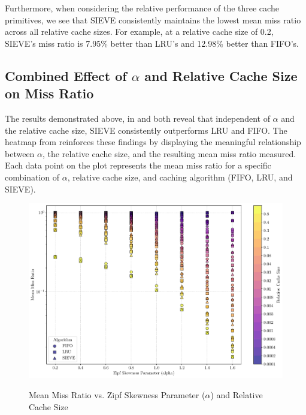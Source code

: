 Furthermore, when considering the relative performance of the three cache primitives, we see that SIEVE consistently maintains the lowest mean miss ratio across all relative cache sizes. For example, at a relative cache size of 0.2, SIEVE's miss ratio is 7.95\% better than LRU's and 12.98\% better than FIFO's.

\subsection{Combined Effect of $\alpha$ and Relative Cache Size on Miss Ratio}


The results demonstrated above, in  and  both reveal that independent of $\alpha$ and the relative cache size, SIEVE consistently outperforms LRU and FIFO. The heatmap from  reinforces these findings by displaying the meaningful relationship between $\alpha$, the relative cache size, and the resulting mean miss ratio measured. Each data point on the plot represents the mean miss ratio for a specific combination of $\alpha$, relative cache size, and caching algorithm (FIFO, LRU, and SIEVE).

\begin{figure}[h!]
    \centering
    \caption{Mean Miss Ratio vs. Zipf Skewness Parameter ($\alpha$) and Relative Cache Size}
    \includegraphics[width=\linewidth]{figures/simulations/miss_ratio_heat_map_no_title.pdf}
    \label{fig:miss-ratio-heatmap}
\end{figure}

